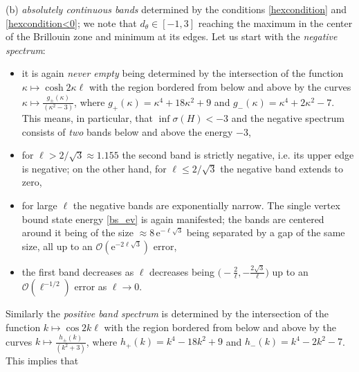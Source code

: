 \documentclass[english]{elsarticle}
\newcommand{\e}{\mathrm{e}}
\begin{document}
\medskip

\noindent (b) \emph{absolutely continuous bands} determined by the conditions \eqref{hexcondition} and \eqref{hexcondition<0}; we note that $d_\theta \in[-1,3]$ reaching the maximum in the center of the Brillouin zone and minimum at its edges. Let us start with the \emph{negative spectrum}:

\begin{itemize}

\item

it is again \emph{never empty} being determined by the intersection
of the function $\kappa \mapsto \cosh 2\kappa\ell$ with the region
bordered from below and above by the curves $\kappa \mapsto
\frac{g_\pm(\kappa)}{(\kappa^2-3)}$, where $g_+(\kappa) =
\kappa^4+18\kappa^2+9$ and $g_-(\kappa) = \kappa^4+2\kappa^2-7$.
This means, in particular, that $\inf\sigma(H)<-3$ and the negative
spectrum consists of \emph{two} bands below and above the energy
$-3$,

\item for $\ell>2/\sqrt{3}\approx 1.155$ the second band is strictly negative, i.e. its upper edge is negative; on the other hand, for $\ell\le 2/\sqrt{3}$ the negative band extends to zero,

\item for large $\ell$ the negative bands are exponentially narrow. The single vertex bound state energy \eqref{bs_ev} is again manifested; the bands are centered around it being of the size $\approx 8\,\mathrm{e}^{-\ell\sqrt{3}}$ being separated by a gap of the same size, all up to an $\mathcal{O}(\e^{-2\ell\sqrt{3}})$ error,

\item the first band decreases as $\ell$ decreases being $\big(-\frac{2}\ell, -\frac{2\sqrt{3}}\ell \big)$ up to an $\mathcal{O}(\ell^{-1/2})$ error as $\ell\to 0$.

\end{itemize}

\noindent Similarly the \emph{positive band spectrum} is determined
by the intersection of the function $k \mapsto \cos 2k\ell$ with the
region bordered from below and above by the curves $k \mapsto
\frac{h_\pm(k)}{(k^2+3)}$, where $h_+(k) = k^4-18k^2+9$ and $h_-(k)
= k^4-2k^2-7$. This implies that
\end{document}
